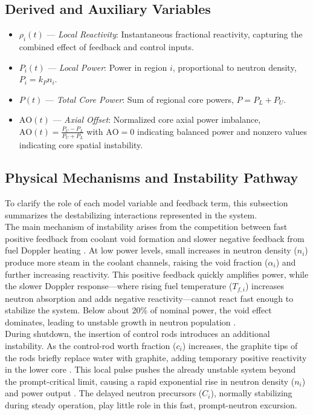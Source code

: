 \documentclass[11pt]{article}
\begin{document}
\subsection{Derived and Auxiliary Variables}
\begin{itemize}
    \item \textbf{$\rho_i(t)$} — \textit{Local Reactivity}: Instantaneous fractional reactivity, capturing the combined effect of feedback and control inputs.
    \item \textbf{$P_i(t)$} — \textit{Local Power}: Power in region $i$, proportional to neutron density, $P_i = k_P n_i$.
    \item \textbf{$P(t)$} — \textit{Total Core Power}: Sum of regional core powers, $P = P_L + P_U$.
    \item \textbf{$\mathrm{AO}(t)$} — \textit{Axial Offset}: Normalized core axial power imbalance, \(\mathrm{AO}(t) = \frac{P_U - P_L}{P_U + P_L}\)
    with $\mathrm{AO}=0$ indicating balanced power and nonzero values indicating core spatial instability.
\end{itemize}

\subsection{Physical Mechanisms and Instability Pathway}
To clarify the role of each model variable and feedback term, this subsection summarizes the destabilizing interactions represented in the system.\\

The main mechanism of instability arises from the competition between fast positive feedback from coolant void formation and slower negative feedback from fuel Doppler heating \cite{INSAG7,Lewis2008}. At low power levels, small increases in neutron density ($n_i$) produce more steam in the coolant channels, raising the void fraction ($\alpha_i$) and further increasing reactivity. This positive feedback quickly amplifies power, while the slower Doppler response—where rising fuel temperature ($T_{f,i}$) increases neutron absorption and adds negative reactivity—cannot react fast enough to stabilize the system. Below about 20\% of nominal power, the void effect dominates, leading to unstable growth in neutron population \cite{Stacey2007}.\\

During shutdown, the insertion of control rods introduces an additional instability. As the control-rod worth fraction ($c_i$) increases, the graphite tips of the rods briefly replace water with graphite, adding temporary positive reactivity in the lower core \cite{INSAG7}. This local pulse pushes the already unstable system beyond the prompt-critical limit, causing a rapid exponential rise in neutron density ($n_i$) and power output \cite{Duderstadt1976,Lewis2008,NP_PointKinetics}. The delayed neutron precursors ($C_i$), normally stabilizing during steady operation, play little role in this fast, prompt-neutron excursion.
\end{document}
